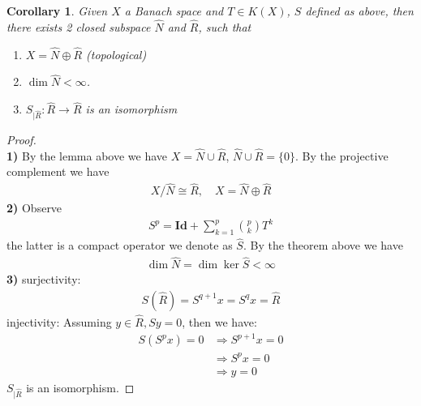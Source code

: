 \documentclass[a4paper,11pt,fleqn]{book}
\newtheorem{corollary}{Corollary}[theorem]
\theoremstyle{definition}
\theoremstyle{remark}
\begin{document}
\begin{corollary}
	Given $X$ a Banach space and $T \in K(X)$, $S$ defined as above, then there exists 2 closed subspace $\hat{N}$ and $\hat{R}$, such that
	\begin{enumerate}
		\item $X = \hat{N} \oplus \hat{R}$ (topological)
		\item $\dim \hat{N} < \infty$.
		\item $S_{|\hat{R}}: \hat{R} \rightarrow \hat{R}$ is an isomorphism
	\end{enumerate}
\end{corollary}
\begin{proof}
\quad \\\textbf{1)}
	By the lemma above we have $X = \hat{N} \cup \hat{R}$, $\hat{N} \cup \hat{R} = \{0\}$. By the projective complement we have
	\begin{align*}
		X\slash \hat{N} \cong \hat{R}, \quad X = \hat{N} \oplus \hat{R}
	\end{align*}
\textbf{2)}
Observe
\begin{align*}
	S^p = \textbf{Id} + \sum_{k = 1}^p \binom{p}{k} T^k
\end{align*}
the latter is a compact operator we denote as $\hat{S}$. By the theorem above we have
\begin{align*}
	\dim \hat{N} = \dim \ker \hat{S} < \infty
\end{align*}
\textbf{3)} surjectivity: 
\begin{align*}
	S(\hat{R}) = S^{q+1}x = S^{q}x = \hat{R}  
\end{align*}
injectivity: Assuming $y \in \hat{R}, Sy = 0$, then we have:
\begin{align*}
	S(S^px) = 0 &\Rightarrow S^{p+1}x = 0 \\
	&\Rightarrow S^p x = 0\\
	&\Rightarrow y = 0
\end{align*}
$S_{|\hat{R}}$ is an isomorphism.
\end{proof}
\end{document}
